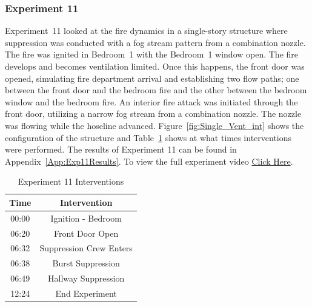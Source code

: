 \documentclass[12pt,oneside]{book}
\begin{document}
\subsubsection{Experiment 11}
Experiment~11 looked at the fire dynamics in a single-story structure where suppression was conducted with a fog stream pattern from a combination nozzle. The fire was ignited in Bedroom~1 with the Bedroom~1 window open. The fire develops and becomes ventilation limited. Once this happens, the front door was opened, simulating fire department arrival and establishing two flow paths; one between the front door and the bedroom fire and the other between the bedroom window and the bedroom fire. An interior fire attack was initiated through the front door, utilizing a narrow fog stream from a combination nozzle. The nozzle was flowing while the hoseline advanced.  Figure~\ref{fig:Single_Vent_int} shows the configuration of the structure and Table~\ref{Table:Exp11Interventions} shows at what times interventions were performed. The results of Experiment 11 can be found in Appendix~\ref{App:Exp11Results}. To view the full experiment video \href{https://player.vimeo.com/video/170499614?autoplay=1}{Click Here}.

\begin{table}[H]
	\centering
	\caption{Experiment 11 Interventions}
	\begin{tabular}{|c|c|} 
		\hline
		Time & Intervention \\ \hline \hline
		00:00 & Ignition - Bedroom \\ \hline
		06:20 & Front Door Open \\ \hline
		06:32 & Suppression Crew Enters\\ \hline
		06:38 & Burst Suppression \\ \hline 
		06:49 & Hallway Suppression \\ \hline
		12:24 & End Experiment\\ \hline
	\end{tabular}
	\label{Table:Exp11Interventions}
\end{table}

\FloatBarrier
\end{document}
